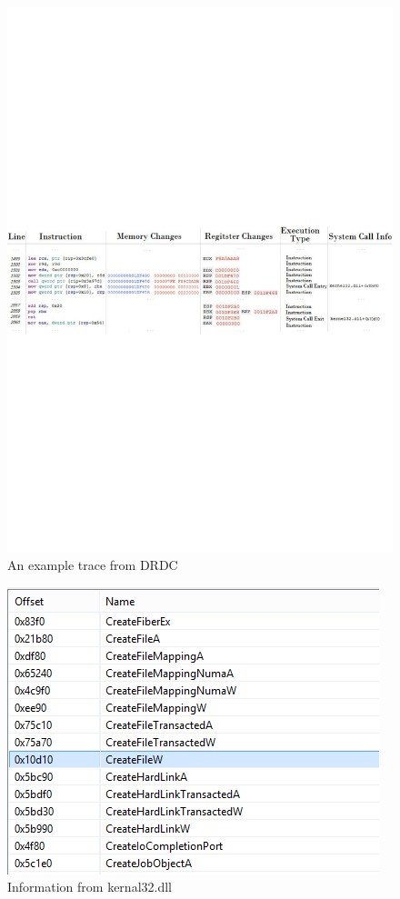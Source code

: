 \begin{figure}[H]
\centerline{\includegraphics[scale=0.45]{Figures/trace}}
\caption{An example trace from DRDC}
\label{trace}
\end{figure}

\begin{figure}[H]
\centerline{\includegraphics[scale=0.6]{Figures/executable}}
\caption{Information from kernal32.dll}
\label{executable}
\end{figure}

